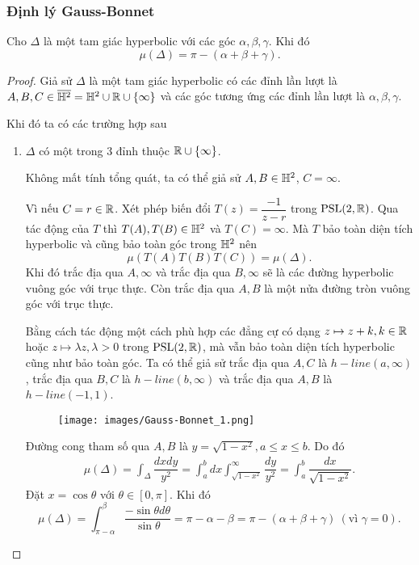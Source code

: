 \subsubsection{Định lý Gauss-Bonnet}
\begin{thm}\label{thm 2.4.5}
    Cho $\Delta$ là một tam giác hyperbolic với các góc $\alpha, \beta, \gamma$. Khi đó \[\mu(\Delta) = \pi - (\alpha + \beta + \gamma).\]
\end{thm}
\begin{proof}
    Giả sử $\Delta$ là một tam giác hyperbolic có các đỉnh lần lượt là $A,B,C \in \overline{\mathbb{H}^2} = \mathbb{H}^2 \cup \mathbb{R}\cup \{\infty\}$ và các góc tương ứng các đỉnh lần lượt là $\alpha,\beta, \gamma$. 

    Khi đó ta có các trường hợp sau
    \begin{enumerate}
        \item $\Delta$ có một trong 3 đỉnh thuộc $\mathbb{R} \cup \{\infty\}$. 
        
        Không mất tính tổng quát, ta có thể giả sử $A, B \in \mathbb{H}^2$, $C = \infty$.
        
        Vì nếu $C = r \in \mathbb{R}$. Xét phép biến đổi $T(z) = \dfrac{-1}{z-r}$ trong $\operatorname{PSL}(2,\mathbb{R})$. Qua tác động của $T$ thì $T(A),T(B) \in \mathbb{H}^2$ và $T(C) = \infty$. Mà $T$ bảo toàn diện tích hyperbolic và cũng bảo toàn góc trong $\mathbb{H}^2$ nên \[\mu(T(A)T(B)T(C)) = \mu(\Delta).\]
        Khi đó trắc địa qua $A, \infty$ và trắc địa qua $B,\infty$ sẽ là các đường hyperbolic vuông góc với trục thực. Còn trắc địa qua $A,B$ là một nửa đường tròn vuông góc với trục thực.
        
        Bằng cách tác động một cách phù hợp các đẳng cự có dạng $z\mapsto z+k,k\in \mathbb{R}$ hoặc $z\mapsto \lambda z, \lambda>0$ trong $\operatorname{PSL}(2,\mathbb{R})$, mà vẫn bảo toàn diện tích hyperbolic cũng như bảo toàn góc. Ta có thể giả sử trắc địa qua $A,C$ là $h-line(a,\infty)$, trắc địa qua $B,C$ là $h-line(b,\infty)$ và trắc địa qua $A,B$ là $h-line(-1,1)$. 

        \begin{figure}[htp!]
            \centering
            \texttt{[image: images/Gauss-Bonnet\_1.png]}
        \end{figure}
        Đường cong tham số qua $A,B$ là $y = \sqrt{1-x^2}, a \leq x \leq b$. 
        Do đó \begin{align*}
            \mu(\Delta) = \int_{\Delta}{\dfrac{dxdy}{y^2}} = \int_a^b{dx}\int_{\sqrt{1-x^2}}^{\infty}{\dfrac{dy}{y^2}} = \int_a^b{\dfrac{dx}{\sqrt{1-x^2}}}.
        \end{align*}
        Đặt $x = \cos\theta$ với $\theta \in [0,\pi]$. Khi đó 
        \[\mu(\Delta) = \int_{\pi-\alpha}^{\beta}{\dfrac{-\sin\theta d\theta}{\sin\theta}} = \pi -\alpha -\beta=\pi-(\alpha + \beta + \gamma)~(\text{vì }\gamma = 0).\]


\end{enumerate}
\end{proof}
